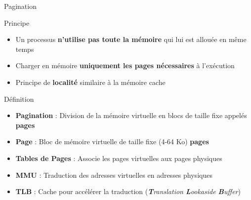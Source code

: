 \documentclass[8pt]{beamer}
\begin{document}
\begin{frame}{Pagination}
    \begin{block}{Principe}
        \begin{itemize}
            \item Un processus \textbf{n'utilise pas toute la mémoire} qui
                  lui est
                  allouée en même
                  temps
            \item Charger en mémoire \textbf{uniquement les pages nécessaires}
                  à
                  l'exécution
            \item Principe de \textbf{localité} similaire \`a la m\'emoire
                  cache
        \end{itemize}
    \end{block}
    \begin{block}{D\'efinition}
        \begin{itemize}
            \item \textbf{Pagination} : Division de la mémoire virtuelle en
                  blocs de taille fixe appelés \textbf{pages}
            \item \textbf{Page} : Bloc de mémoire virtuelle de taille fixe
                  (4-64 Ko)
                  \textbf{pages}
            \item \textbf{Tables de Pages} : Associe les pages
                  virtuelles aux pages physiques
            \item \textbf{MMU} : Traduction des adresses virtuelles en
                  adresses physiques
            \item \textbf{TLB} : Cache pour accélérer la
                  traduction (\emph{\textbf{T}ranslation \textbf{L}ookaside
                      \textbf{B}uffer})
        \end{itemize}
    \end{block}
\end{frame}
\end{document}
